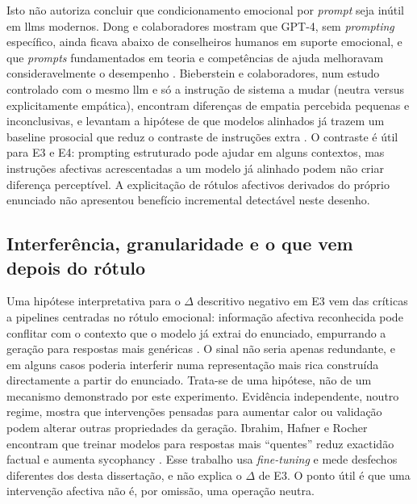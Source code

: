 Isto não autoriza concluir que condicionamento emocional por \textit{prompt} seja inútil em \glspl{llm} modernos. Dong e colaboradores mostram que GPT-4, sem \textit{prompting} específico, ainda ficava abaixo de conselheiros humanos em suporte emocional, e que \textit{prompts} fundamentados em teoria e competências de ajuda melhoravam consideravelmente o desempenho \parencite{Dong2025GPT4EmotionSupport}. Bieberstein e colaboradores, num estudo controlado com o mesmo \gls{llm} e só a instrução de sistema a mudar (neutra versus explicitamente empática), encontram diferenças de empatia percebida pequenas e inconclusivas, e levantam a hipótese de que modelos alinhados já trazem um baseline prosocial que reduz o contraste de instruções extra \parencite{Bieberstein2026PromptEmpathy}. O contraste é útil para E3 e E4: prompting estruturado pode ajudar em alguns contextos, mas instruções afectivas acrescentadas a um modelo já alinhado podem não criar diferença perceptível. A explicitação de rótulos afectivos derivados do próprio enunciado não apresentou benefício incremental detectável neste desenho.

\subsection{Interferência, granularidade e o que vem depois do rótulo}
\label{subsec:disc_mecanismos}

Uma hipótese interpretativa para o \(\Delta\) descritivo negativo em E3 vem das críticas a pipelines centradas no rótulo emocional: informação afectiva reconhecida pode conflitar com o contexto que o modelo já extrai do enunciado, empurrando a geração para respostas mais genéricas \parencite{Huangfu2025NEC}. O sinal não seria apenas redundante, e em alguns casos poderia interferir numa representação mais rica construída directamente a partir do enunciado. Trata-se de uma hipótese, não de um mecanismo demonstrado por este experimento. Evidência independente, noutro regime, mostra que intervenções pensadas para aumentar calor ou validação podem alterar outras propriedades da geração. Ibrahim, Hafner e Rocher encontram que treinar modelos para respostas mais ``quentes'' reduz exactidão factual e aumenta sycophancy \parencite{Ibrahim2026WarmSycophancy}. Esse trabalho usa \textit{fine-tuning} e mede desfechos diferentes dos desta dissertação, e não explica o \(\Delta\) de E3. O ponto útil é que uma intervenção afectiva não é, por omissão, uma operação neutra.

